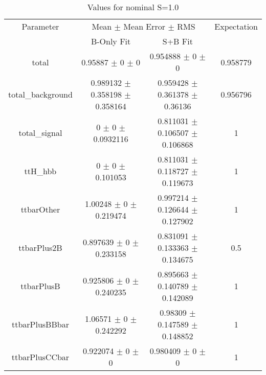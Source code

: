 \begin{table}
\centering
\caption{Values for nominal S=1.0}
\begin{tabular}{cccc}
\toprule
Parameter & \multicolumn{2}{c}{Mean $\pm$ Mean Error $\pm$ RMS} & Expectation\\
 & B-Only Fit & S+B Fit & \\
\midrule
total & \num{0.95887} $\pm$ \num{0} $\pm$ \num{0} & \num{0.954888} $\pm$ \num{0} $\pm$ \num{0} & \num{0.958779}\\
total\_background & \num{0.989132} $\pm$ \num{0.358198} $\pm$ \num{0.358164} & \num{0.959428} $\pm$ \num{0.361378} $\pm$ \num{0.36136} & \num{0.956796}\\
total\_signal & \num{0} $\pm$ \num{0} $\pm$ \num{0.0932116} & \num{0.811031} $\pm$ \num{0.106507} $\pm$ \num{0.106868} & \num{1}\\
ttH\_hbb & \num{0} $\pm$ \num{0} $\pm$ \num{0.101053} & \num{0.811031} $\pm$ \num{0.118727} $\pm$ \num{0.119673} & \num{1}\\
ttbarOther & \num{1.00248} $\pm$ \num{0} $\pm$ \num{0.219474} & \num{0.997214} $\pm$ \num{0.126644} $\pm$ \num{0.127902} & \num{1}\\
ttbarPlus2B & \num{0.897639} $\pm$ \num{0} $\pm$ \num{0.233158} & \num{0.831091} $\pm$ \num{0.133363} $\pm$ \num{0.134675} & \num{0.5}\\
ttbarPlusB & \num{0.925806} $\pm$ \num{0} $\pm$ \num{0.240235} & \num{0.895663} $\pm$ \num{0.140789} $\pm$ \num{0.142089} & \num{1}\\
ttbarPlusBBbar & \num{1.06571} $\pm$ \num{0} $\pm$ \num{0.242292} & \num{0.98309} $\pm$ \num{0.147589} $\pm$ \num{0.148852} & \num{1}\\
ttbarPlusCCbar & \num{0.922074} $\pm$ \num{0} $\pm$ \num{0} & \num{0.980409} $\pm$ \num{0} $\pm$ \num{0} & \num{1}\\
\bottomrule
\end{tabular}
\end{table}